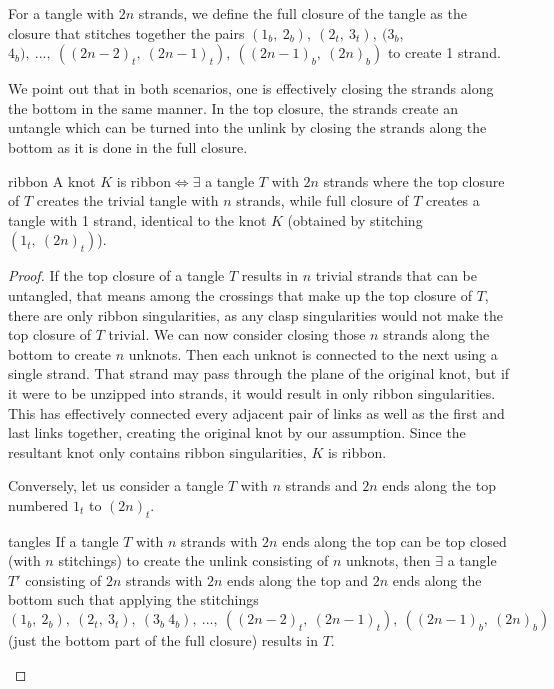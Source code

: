 \begin{paper}

For a tangle with $2n$ strands, we define the full closure of the tangle as the
closure that stitches together the pairs $(1_b,~2_b),~(2_t,~3_t),~(3_b$,
$4_b),~...,~((2n-2)_t,~(2n-1)_t),~((2n-1)_b,~(2n)_b)$ to create 1 strand.


We point out that in both scenarios, one is effectively closing the strands
along the bottom in the same manner.
In the top closure, the strands create an untangle which can be turned into the
unlink by closing the strands along the bottom as it is done in the
full closure.

\begin{papertheorem}{ribbon}
A knot $K$ is ribbon$\iff\exists$ a tangle $T$ with $2n$ strands where the
top closure of $T$ creates the trivial tangle with $n$ strands, while
full closure of $T$ creates a tangle with 1 strand, identical to the knot $K$
(obtained by stitching $(1_t,~(2n)_t)$).
\end{papertheorem}
\begin{proof}
If the top closure of a tangle $T$ results in $n$ trivial strands that can be
untangled, that means among the crossings that make up the top closure of $T$,
there are only ribbon singularities, as any clasp singularities would not make
the top closure of $T$ trivial.
We can now consider closing those $n$ strands along the bottom to create $n$
unknots.
Then each unknot is connected to the next using a single strand.
That strand may pass through the plane of the original knot, but if it were to
be unzipped into strands, it would result in only ribbon singularities.
This has effectively connected every adjacent pair of links as well as the first
and last links together, creating the original knot by our assumption.
Since the resultant knot only contains ribbon singularities, $K$ is ribbon.

Conversely, let us consider a tangle $T$ with $n$ strands and $2n$ ends along
the top numbered $1_t$ to $(2n)_t$.
\begin{paperlemma}{tangles}
If a tangle $T$ with $n$ strands with $2n$ ends along the top can be top closed
(with $n$ stitchings) to create the unlink consisting of $n$ unknots, then
$\exists$ a tangle $T'$ consisting of $2n$ strands with $2n$ ends along the top
and $2n$ ends along the bottom such that applying the stitchings$(1_b,~2_b),~
(2_t,~3_t),~(3_b~4_b),~...,~((2n-2)_t,~(2n-1)_t),~((2n-1)_b,~(2n)_b)$ (just the
bottom part of the full closure) results in $T$.


\end{paperlemma}
\end{proof}
\end{paper}
